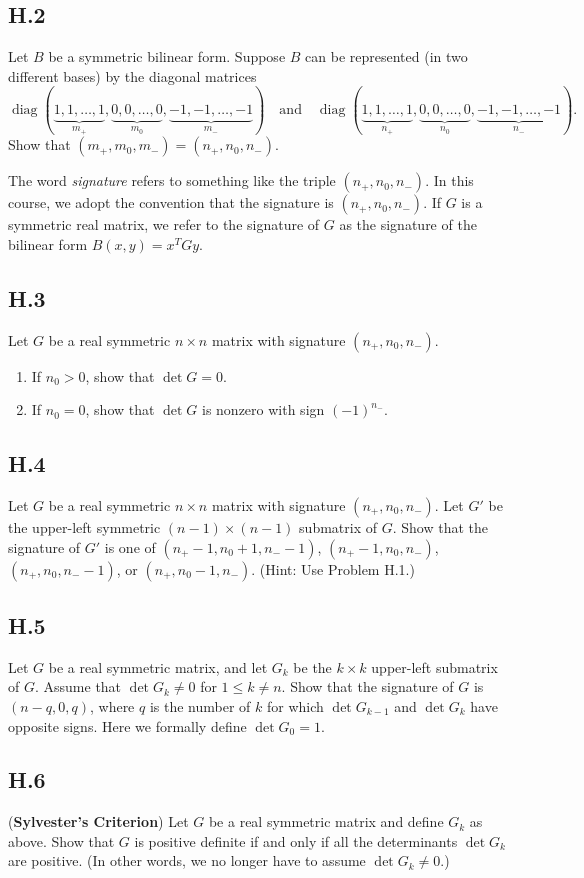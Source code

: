 \documentclass[lang=cn,11pt]{template}
\begin{document}
\subsection*{H.2} Let \( B \) be a symmetric bilinear form. Suppose \( B \) can be represented (in two different bases) by the diagonal matrices
\[
\operatorname{diag}(\underbrace{1, 1, \dots, 1}_{m_+}, \underbrace{0, 0, \dots, 0}_{m_0}, \underbrace{-1, -1, \dots, -1}_{m_-}) \quad \text{and} \quad \operatorname{diag}(\underbrace{1, 1, \dots, 1}_{n_+}, \underbrace{0, 0, \dots, 0}_{n_0}, \underbrace{-1, -1, \dots, -1}_{n_-}).
\]
Show that \( (m_+, m_0, m_-) = (n_+, n_0, n_-) \).

\begin{remark}
The word \textit{signature} refers to something like the triple \( (n_+, n_0, n_-) \). In this course, we adopt the convention that the signature is \( (n_+, n_0, n_-) \). If \( G \) is a symmetric real matrix, we refer to the signature of \( G \) as the signature of the bilinear form \( B(x, y) = x^T G y \).
\end{remark}

\subsection*{H.3} Let \( G \) be a real symmetric \( n \times n \) matrix with signature \( (n_+, n_0, n_-) \).
\begin{enumerate}
    \item If \( n_0 > 0 \), show that \( \det G = 0 \).
    \item If \( n_0 = 0 \), show that \( \det G \) is nonzero with sign \( (-1)^{n_-} \).
\end{enumerate}

\subsection*{H.4} Let \( G \) be a real symmetric \( n \times n \) matrix with signature \( (n_+, n_0, n_-) \). Let \( G' \) be the upper-left symmetric \( (n-1) \times (n-1) \) submatrix of \( G \). Show that the signature of \( G' \) is one of \( (n_+ - 1, n_0 + 1, n_- - 1) \), \( (n_+ - 1, n_0, n_-) \), \( (n_+, n_0, n_- - 1) \), or \( (n_+, n_0 - 1, n_-) \). (Hint: Use Problem H.1.)

\subsection*{H.5} Let \( G \) be a real symmetric matrix, and let \( G_k \) be the \( k \times k \) upper-left submatrix of \( G \). Assume that \( \det G_k \neq 0 \) for \( 1 \leq k \neq n \). Show that the signature of \( G \) is \( (n - q, 0, q) \), where \( q \) is the number of \( k \) for which \( \det G_{k-1} \) and \( \det G_k \) have opposite signs. Here we formally define \( \det G_0 = 1 \).

\subsection*{H.6} (\textbf{Sylvester’s Criterion}) Let \( G \) be a real symmetric matrix and define \( G_k \) as above. Show that \( G \) is positive definite if and only if all the determinants \( \det G_k \) are positive. (In other words, we no longer have to assume \( \det G_k \neq 0 \).)
\end{document}
